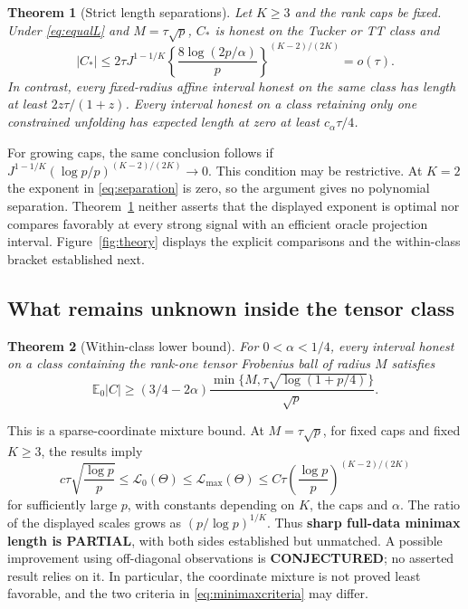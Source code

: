 \documentclass[11pt]{article}
\newtheorem{theorem}{Theorem}
\theoremstyle{remark}
\newcommand{\E}{\mathbb E}
\newcommand{\calL}{\mathcal L}
\begin{document}
\begin{theorem}[Strict length separations]\label{thm:separation}
Let $K\ge3$ and the rank caps be fixed. Under \eqref{eq:equalL} and $M=\tau\sqrt p$, $C_*$ is honest on the Tucker or TT class and
\begin{equation}\label{eq:separation}
 |C_*|\le2\tau J^{1-1/K}
 \left\{\frac{8\log(2p/\alpha)}p\right\}^{(K-2)/(2K)}=o(\tau).
\end{equation}
In contrast, every fixed-radius affine interval honest on the same class has length at least $2z\tau/(1+z)$. Every interval honest on a class retaining only one constrained unfolding has expected length at zero at least $c_\alpha\tau/4$.
\end{theorem}

For growing caps, the same conclusion follows if $J^{1-1/K}(\log p/p)^{(K-2)/(2K)}\to0$. This condition may be restrictive. At $K=2$ the exponent in \eqref{eq:separation} is zero, so the argument gives no polynomial separation. Theorem~\ref{thm:separation} neither asserts that the displayed exponent is optimal nor compares favorably at every strong signal with an efficient oracle projection interval. Figure~\ref{fig:theory} displays the explicit comparisons and the within-class bracket established next.

\subsection{What remains unknown inside the tensor class}\label{sec:gap}

\begin{theorem}[Within-class lower bound]\label{thm:jointlower}
For $0<\alpha<1/4$, every interval honest on a class containing the rank-one tensor Frobenius ball of radius $M$ satisfies
\begin{equation}\label{eq:jointlower}
 \E_0|C|\ge(3/4-2\alpha)
 \frac{\min\{M,\tau\sqrt{\log(1+p/4)}\}}{\sqrt p}.
\end{equation}
\end{theorem}

This is a sparse-coordinate mixture bound. At $M=\tau\sqrt p$, for fixed caps and fixed $K\ge3$, the results imply
\begin{equation}\label{eq:gap}
 c\tau\sqrt{\frac{\log p}p}
 \le\calL_0(\Theta)\le\calL_{\max}(\Theta)
 \le C\tau\left(\frac{\log p}p\right)^{(K-2)/(2K)}
\end{equation}
for sufficiently large $p$, with constants depending on $K$, the caps and $\alpha$. The ratio of the displayed scales grows as $(p/\log p)^{1/K}$. Thus \textbf{sharp full-data minimax length is PARTIAL}, with both sides established but unmatched. A possible improvement using off-diagonal observations is \textbf{CONJECTURED}; no asserted result relies on it. In particular, the coordinate mixture is not proved least favorable, and the two criteria in \eqref{eq:minimaxcriteria} may differ.
\end{document}

